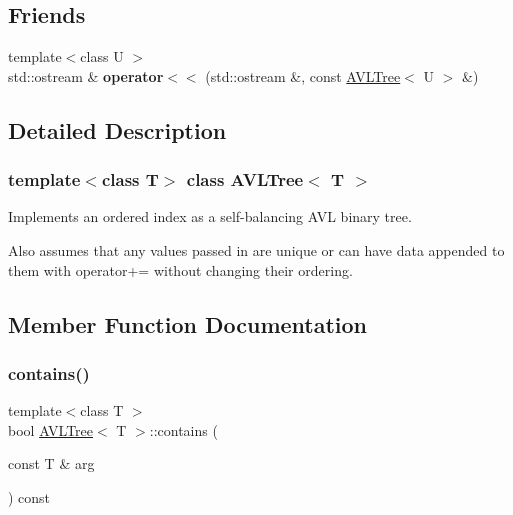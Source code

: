 \subsection*{Friends}
\begin{DoxyCompactItemize}
\item 
\mbox{\label{classAVLTree_ab87e89a876f46efe5d304239c352e804}} 
{\footnotesize template$<$class U $>$ }\\std\+::ostream \& {\bfseries operator$<$$<$} (std\+::ostream \&, const \mbox{\hyperlink{classAVLTree}{A\+V\+L\+Tree}}$<$ U $>$ \&)
\end{DoxyCompactItemize}


\subsection{Detailed Description}
\subsubsection*{template$<$class T$>$\newline
class A\+V\+L\+Tree$<$ T $>$}

Implements an ordered index as a self-\/balancing A\+VL binary tree.

Also assumes that any values passed in are unique or can have data appended to them with operator+= without changing their ordering. 

\subsection{Member Function Documentation}
\mbox{\label{classAVLTree_afe724de4c687945d687d7013f4447d20}} 
\subsubsection{\texorpdfstring{contains()}{contains()}}
{\footnotesize\ttfamily template$<$class T $>$ \\
bool \mbox{\hyperlink{classAVLTree}{A\+V\+L\+Tree}}$<$ T $>$\+::contains (\begin{DoxyParamCaption}\item[{const T \&}]{arg }\end{DoxyParamCaption}) const\hspace{0.3cm}{\ttfamily [virtual]}}


